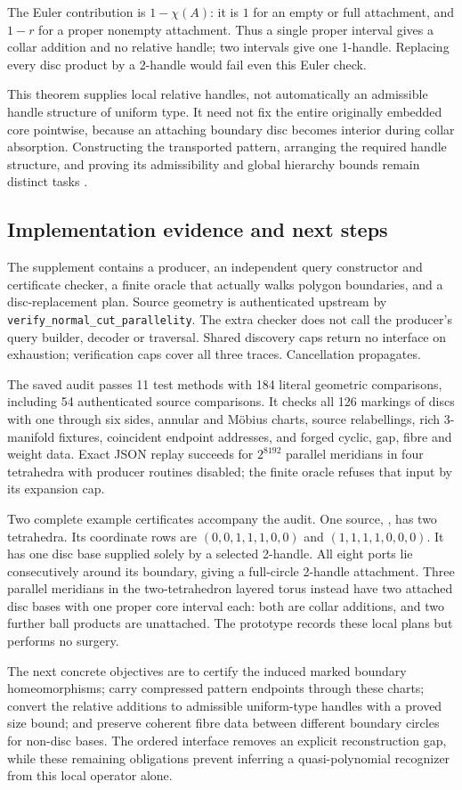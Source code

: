The Euler contribution is $1-\chi(A)$: it is $1$ for an empty or full
attachment, and $1-r$ for a proper nonempty attachment.  Thus a single
proper interval gives a collar addition and no relative handle; two
intervals give one 1-handle.  Replacing every disc product by a 2-handle
would fail even this Euler check.

This theorem supplies local relative handles, not automatically an
admissible handle structure of uniform type.  It need not fix the entire
originally embedded core pointwise, because an attaching boundary disc
becomes interior during collar absorption.  Constructing the transported
pattern, arranging the required handle structure, and proving its
admissibility and global hierarchy bounds remain distinct tasks
\cite{lackenby2026}.

\subsection{Implementation evidence and next steps}

The supplement contains a producer, an independent query constructor and
certificate checker, a finite oracle that actually walks polygon boundaries,
and a disc-replacement plan.  Source geometry is authenticated upstream by
\texttt{verify\_normal\_cut\_parallelity}.  The extra checker does not call
the producer's query builder, decoder or traversal.  Shared discovery caps
return no interface on exhaustion; verification caps cover all three
traces.  Cancellation propagates.

The saved audit passes 11 test methods with 184 literal geometric comparisons,
including 54 authenticated source comparisons.  It checks all 126 markings
of discs with one through six sides, annular and M\"obius charts, source
relabellings, rich 3-manifold fixtures, coincident endpoint addresses, and
forged cyclic, gap, fibre and weight data.  Exact JSON replay succeeds for
$2^{8192}$ parallel meridians in four tetrahedra with producer routines
disabled; the finite oracle refuses that input by its expansion cap.

Two complete example certificates accompany the audit. One source,
, has two tetrahedra. Its coordinate rows are
$(0,0,1,1,1,0,0)$ and $(1,1,1,1,0,0,0)$. It has one disc base supplied solely
by a selected 2-handle.  All eight ports lie consecutively around its
boundary, giving a full-circle 2-handle attachment.  Three parallel
meridians in the two-tetrahedron layered torus instead have two attached
disc bases with one proper core interval each: both are collar additions,
and two further ball products are unattached.  The prototype records these
local plans but performs no surgery.

The next concrete objectives are to certify the induced marked boundary
homeomorphisms; carry compressed pattern endpoints through these charts;
convert the relative additions to admissible uniform-type handles with a
proved size bound; and preserve coherent fibre data between different
boundary circles for non-disc bases.  The ordered interface removes an
explicit reconstruction gap, while these remaining obligations prevent
inferring a quasi-polynomial recognizer from this local operator alone.
